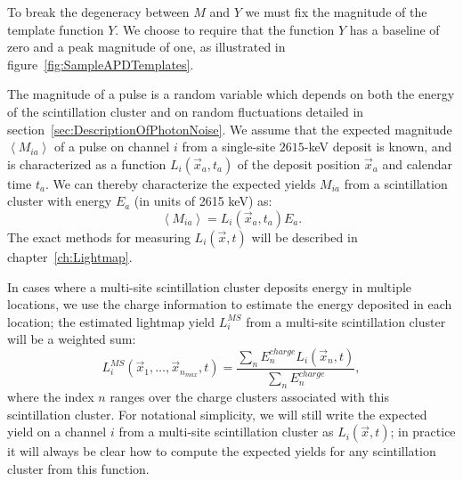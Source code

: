 To break the degeneracy between $M$ and $Y$ we must fix the magnitude of the template function $Y$.  We choose to require that the function $Y$ has a baseline of zero and a peak magnitude of one, as illustrated in figure~\ref{fig:SampleAPDTemplates}.

The magnitude of a pulse is a random variable which depends on both the energy of the scintillation cluster and on random fluctuations detailed in section~\ref{sec:DescriptionOfPhotonNoise}.  We assume that the expected magnitude $\left<M_{ia}\right>$ of a pulse on channel $i$ from a single-site $2615$-keV deposit is known, and is characterized as a function $L_i(\vec{x}_a, t_a)$ of the deposit position $\vec{x}_a$ and calendar time $t_a$.  We can thereby characterize the expected yields $M_{ia}$ from a scintillation cluster with energy $E_a$ (in units of 2615 keV) as:
\begin{equation}\label{eqn:DefineLByEandM}
\left< M_{ia} \right> = L_i(\vec{x}_a, t_a) E_a.
\end{equation}
The exact methods for measuring $L_i(\vec{x}, t)$ will be described in chapter~\ref{ch:Lightmap}.

In cases where a multi-site scintillation cluster deposits energy in multiple locations, we use the charge information to estimate the energy deposited in each location; the estimated lightmap yield $L_i^{MS}$ from a multi-site scintillation cluster will be a weighted sum:
\begin{equation}
L_i^{MS}(\vec{x}_1, \dots, \vec{x}_{n_{max}}, t) = \frac{\sum_n E_n^{charge} L_i(\vec{x}_n, t)}{\sum_n E_n^{charge}},
\end{equation}
where the index $n$ ranges over the charge clusters associated with this scintillation cluster.  For notational simplicity, we will still write the expected yield on a channel $i$ from a multi-site scintillation cluster as $L_i(\vec{x}, t)$; in practice it will always be clear how to compute the expected yields for any scintillation cluster from this function.

